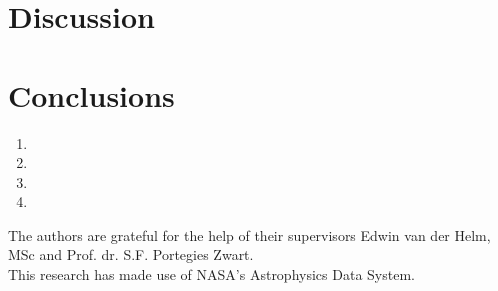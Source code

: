\documentclass{aa}
\begin{document}





\section{Discussion}\label{sec:discussion}

\section{Conclusions}\label{sec:conclusions}
\begin{enumerate}
    \item
    \item
    \item
    \item
\end{enumerate}


\begin{acknowledgements}
The authors are grateful for the help of their supervisors Edwin van der Helm, MSc and Prof. dr. S.F. Portegies Zwart. \\

This research has made use of NASA's Astrophysics Data System.
\end{acknowledgements}





\end{document}
